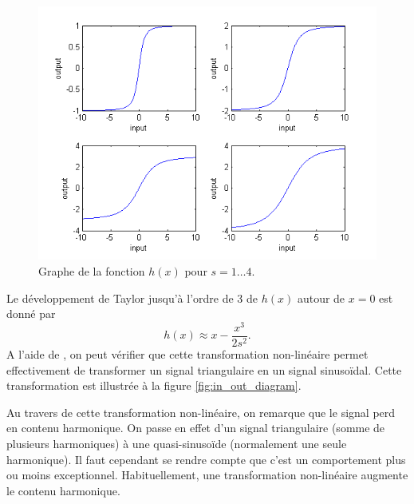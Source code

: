 \begin{figure}[ht]
	\centering
	\includegraphics[scale=0.6]{img/non-linear-transfer.png}
	\caption{Graphe de la fonction $h(x)$ pour $s=1\dots4$.}
	\label{fig:non-linear-transfer}
\end{figure}

Le développement de Taylor jusqu'à l'ordre de 3 de
$h(x)$ autour de $x=0$ est donné par 
\[ h(x) \approx x-\frac{x^3}{2s^2}. \]
A l'aide de \matlab, on peut vérifier que cette
transformation non-linéaire permet effectivement
de transformer un signal triangulaire en un signal
sinusoïdal. Cette transformation est illustrée à
la figure \ref{fig:in_out_diagram}.

\begin{correction}
	Au travers de cette transformation non-linéaire,
	on remarque que le signal perd en contenu harmonique.
	On passe en effet d'un signal triangulaire (somme de
	plusieurs harmoniques) à une quasi-sinusoïde (normalement
	une seule harmonique). Il faut cependant se rendre compte
	que c'est un comportement plus ou moins exceptionnel.
	Habituellement, une transformation non-linéaire augmente
	le contenu harmonique.
\end{correction}

